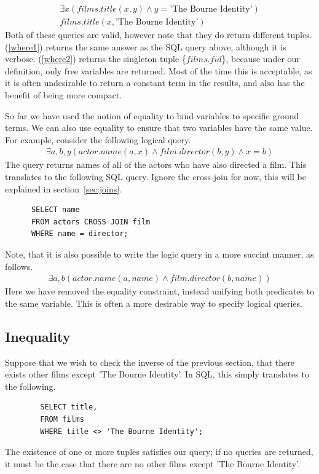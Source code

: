 \documentclass[a4paper, 11pt]{article}
\begin{document}
      \begin{gather}
        \exists x(films.title(x, y) \land y = \text{'The Bourne
        Identity'})\label{where1}\\
        films.title(x, \text{'The Bourne Identity'})\label{where2}
      \end{gather}
      Both of these queries are valid, however note that they do return different
      tuples. (\ref{where1}) returns the same answer as the SQL query above, although
      it is verbose. (\ref{where2}) returns the singleton tuple \{$films.fid$\},
      because under our definition, only free variables are returned. Most of
      the time this is acceptable, as it is often undesirable to return a
      constant term in the results, and also has the benefit of being more
      compact.

      So far we have used the notion of equality to bind variables to specific
      ground terms. We can also use equality to ensure that two variables have
      the same value. For example, consider the following logical query.
      \begin{gather}
        \exists a,b,y(actor.name(a, x) \land film.director(b, y) \land x = b)
      \end{gather}
      The query returns names of all of the actors who have also directed a
      film. This translates to the following SQL query. Ignore the cross join
      for now, this will be explained in section~\ref{sec:joins}.
      \begin{verbatim}
      SELECT name
      FROM actors CROSS JOIN film
      WHERE name = director;
      \end{verbatim}
      Note, that it is also possible to write the logic query in a more succint
      manner, as follows.
      \begin{gather}
        \exists a,b(actor.name(a, name) \land film.director(b, name))
      \end{gather}
      Here we have removed the equality constraint, instead unifying both
      predicates to the same variable. This is often a more desirable way to
      specify logical queries.

    \subsection{Inequality}

      Suppose that we wish to check the inverse of the previous section, that
      there exists other films except 'The Bourne Identity'. In SQL, this
      simply translates to the following.
      \begin{verbatim}
        SELECT title,
        FROM films
        WHERE title <> 'The Bourne Identity';
      \end{verbatim}
      The existence of one or more tuples satisfies our query; if no queries
      are returned, it must be the case that there are no other films except
      'The Bourne Identity'.
\end{document}
